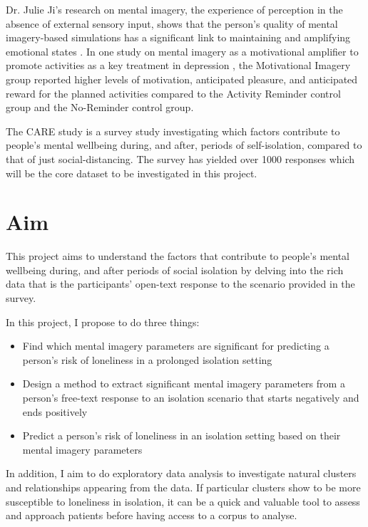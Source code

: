 \documentclass[12pt, a4paper]{article}
\begin{document}
Dr. Julie Ji's research on mental imagery, the experience of perception in the absence of external sensory input, shows that the person's quality of mental imagery-based simulations has a significant link to maintaining and amplifying emotional states \cite{conceptualandclinical}. In one study on mental imagery as a motivational amplifier to promote activities as a key treatment in depression \cite{motivationalamplifier}, the Motivational Imagery group reported higher levels of motivation, anticipated pleasure, and anticipated reward for the planned activities compared to the Activity Reminder control group and the No-Reminder control group.

The CARE study is a survey study investigating which factors contribute to people's mental wellbeing during, and after, periods of self-isolation, compared to that of just social-distancing. The survey has yielded over 1000 responses which will be the core dataset to be investigated in this project.

\section*{Aim} This project aims to understand the factors that contribute to people's mental wellbeing during, and after periods of social isolation by delving into the rich data that is the participants' open-text response to the scenario provided in the survey.

In this project, I propose to do three things: 
\begin{itemize}
	\item Find which mental imagery parameters are significant for predicting a person's risk of loneliness in a prolonged isolation setting  
	\item Design a method to extract significant mental imagery parameters from a person's free-text response to an isolation scenario that starts negatively and ends positively
	\item Predict a person's risk of loneliness in an isolation setting based on their mental imagery parameters
\end{itemize}

In addition, I aim to do exploratory data analysis to investigate natural clusters and relationships appearing from the data. If particular clusters show to be more susceptible to loneliness in isolation, it can be a quick and valuable tool to assess and approach patients before having access to a corpus to analyse.
\end{document}
